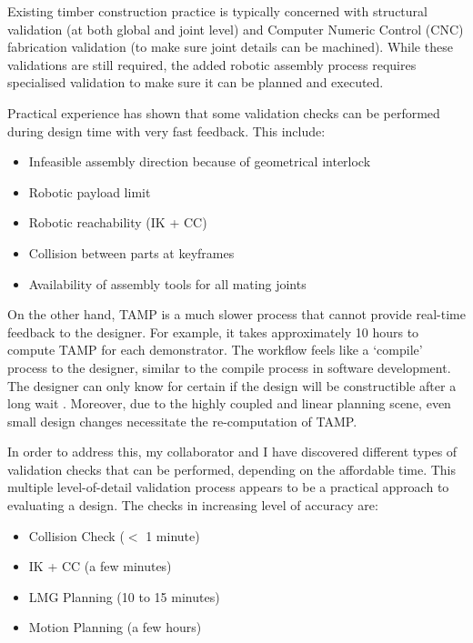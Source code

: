 Existing timber construction practice is typically concerned with structural validation (at both global and joint level) and Computer Numeric Control (CNC) fabrication validation (to make sure joint details can be machined). While these validations are still required, the added robotic assembly process requires specialised validation to make sure it can be planned and executed. 

Practical experience has shown that some validation checks can be performed during design time with very fast feedback. This include: 

\begin{itemize}
	\item Infeasible assembly direction because of geometrical interlock
	\item Robotic payload limit 
	\item Robotic reachability (IK + CC) 
	\item Collision between parts at keyframes
	\item Availability of assembly tools for all mating joints
\end{itemize}

On the other hand, TAMP is a much slower process that cannot provide real-time feedback to the designer. For example, it takes approximately 10 hours to compute TAMP for each demonstrator. The workflow feels like a ‘compile’ process to the designer, similar to the compile process in software development. The designer can only know for certain if the design will be constructible after a long wait . Moreover, due to the highly coupled and linear planning scene, even small design changes necessitate the re-computation of TAMP.

In order to address this, my collaborator and I have discovered different types of validation checks that can be performed, depending on the affordable time. This multiple level-of-detail validation process appears to be a practical approach to evaluating a design. The checks in increasing level of accuracy are:

\begin{itemize}
	\item Collision Check ($<$ 1 minute)

	\item IK + CC (a few minutes) 

	\item LMG Planning (10 to 15 minutes) 

	\item Motion Planning (a few hours) 

\end{itemize}

